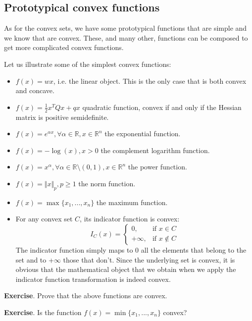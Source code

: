 \subsection{Prototypical convex functions}
\par As for the convex sets, we have some prototypical functions that are simple and we know that are convex. These, and many other, functions can be composed to get more complicated convex functions.
\par Let us illustrate some of the simplest convex functions:
\begin{itemize}
    \item $f(x) = wx$, i.e. the linear object. This is the only case that is both convex and concave.
    \item $f(x) = \frac{1}{2}x^T Q x + qx$ quadratic function, convex if and only if the Hessian matrix is positive semidefinite.
    \item $f(x) = e^{\alpha x}, \forall \alpha \in \mathbb{R}, x \in \mathbb{R}^n$ the exponential function.
    \item $f(x) = - \log(x), x > 0$ the complement logarithm function.
    \item $f(x) = x^\alpha, \forall \alpha \in \mathbb{R} \setminus (0,1), x \in \mathbb{R}^n$ the power function.
    \item $f(x) = \Vert x \Vert_p, p \geq 1$ the norm function.
    \item $f(x) = \max\{x_1,...,x_n\}$ the maximum function.
    \item For any convex set $C$, its indicator function is convex:
    \begin{equation}
        I_C(x) = \begin{cases} 0, & \mbox{if } x \in C \\ +\infty, & \mbox{if } x \notin C \end{cases}
    \end{equation}
    The indicator function simply maps to 0 all the elements that belong to the set and to +$\infty$ those that don't. Since the underlying set is convex, it is obvious that the mathematical object that we obtain when we apply the indicator function transformation is indeed convex.
\end{itemize}
\par \textbf{Exercise}. Prove that the above functions are convex.
\par \textbf{Exercise}. Is the function $f(x) = \min\{x_1,...,x_n\}$ convex?
